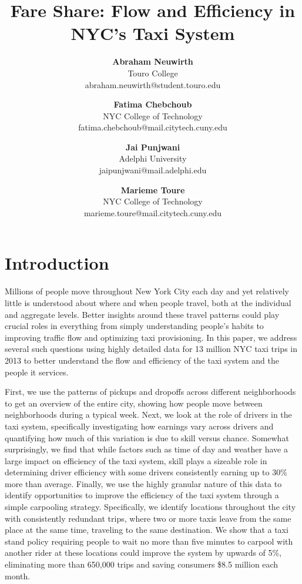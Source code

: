 \documentclass[twocolumn]{article}
\title{\vspace{-0.25in}Fare Share: Flow and Efficiency in NYC's Taxi System}
\author{
\normalsize{\textbf{Abraham Neuwirth}}\\ 
\small Touro College \\ 
\small abraham.neuwirth@student.touro.edu
\and 
\normalsize{\textbf{Fatima Chebchoub}}\\ 
\small NYC College of Technology\\ 
\small fatima.chebchoub@mail.citytech.cuny.edu 
\and 
\normalsize{\textbf{Jai Punjwani}}\\
\small Adelphi University\\
\small jaipunjwani@mail.adelphi.edu 
\and 
\normalsize{\textbf{Marieme Toure}}\\ 
\small NYC College of Technology\\ 
\small marieme.toure@mail.citytech.cuny.edu
}
\date{\vspace{-5ex}}
\begin{document}
\maketitle

\section{Introduction}

Millions of people move throughout New York City each day and yet relatively little is understood about where and when people travel, both at the individual and aggregate levels.
Better insights around these travel patterns could play crucial roles in everything from simply understanding people's habits to improving traffic flow and optimizing taxi provisioning.
In this paper, we address several such questions using highly detailed data for 13 million NYC taxi trips in 2013 to better understand the flow and efficiency of the taxi system and the people it services.

First, we use the patterns of pickups and dropoffs across different neighborhoods to get an overview of the entire city, showing how people move between neighborhoods during a typical week.
Next, we look at the role of drivers in the taxi system, specifically investigating how earnings vary across drivers and quantifying how much of this variation is due to skill versus chance.
Somewhat surprisingly, we find that while factors such as time of day and weather have a large impact on efficiency of the taxi system, skill plays a sizeable role in determining driver efficiency with some drivers consistently earning up to 30\% more than average.
Finally, we use the highly granular nature of this data to identify opportunities to improve the efficiency of the taxi system through a simple carpooling strategy.
Specifically, we identify locations throughout the city with consistently redundant trips, where two or more taxis leave from the same place at the same time, traveling to the same destination.
We show that a taxi stand policy requiring people to wait no more than five minutes to carpool with another rider at these locations could improve the system by upwards of 5\%, eliminating more than 650,000 trips and saving consumers \$8.5 million each month.
\end{document}
